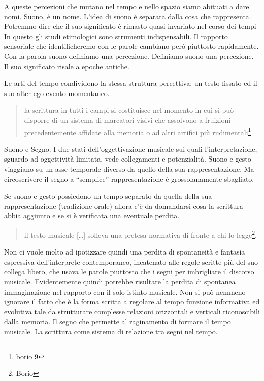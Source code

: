 
A queste percezioni che mutano nel tempo e nello spazio siamo abituati a dare
nomi. Suono, è un nome. L'idea di suono è separata dalla cosa che rappresenta.
Potremmo dire che il suo significato è rimasto quasi invariato nel corso dei tempi
In questo gli studi etimologici sono strumenti indispensabili.
Il rapporto sensoriale che identificheremo con le parole cambiano però piuttosto
rapidamente. Con la parola suono definiamo una percezione. Definiamo suono una
percezione. Il suo significato risale a epoche antiche.

Le arti del tempo condividono la stessa struttura percettiva: un testo fissato
ed il suo alter ego evento momentaneo.

\begin{quote}
	la scrittura in tutti i campi si costituisce nel momento in cui si può disporre
	di un sistema di marcatori visivi che assolvono a fruizioni precedentemente
	affidate alla memoria o ad altri artifici più rudimentali\footnote{borio 9}
\end{quote}

Suono e Segno. I due stati dell'oggettivazione musicale sui quali l'interpretazione,
sguardo ad oggettività limitata, vede collegamenti e potenzialità. Suono e gesto
viaggiano su un asse temporale diverso da quello della sua rappresentazione. Ma
circoscrivere il segno a “semplice” rappresentazione è grossolanamente sbagliato.

Se suono e gesto possiedono un tempo separato da quella della sua rappresentazione
(tradizione orale) allora c'è da domandarsi cosa la scrittura abbia aggiunto e se
si è verificata una eventuale perdita.

\begin{quote}
	il testo musicale [\ldots] solleva una pretesa normativa di fronte a chi lo
	legge\footnote{Borio}.
\end{quote}

Non ci vuole molto ad ipotizzare quindi una perdita di spontaneità e fantasia
espressiva dell'interprete contemporaneo, incatenato alle regole scritte più del
suo collega libero, che usava le parole piuttosto che i segni per imbrigliare il
discorso musicale. Evidentemente quindi potrebbe risultare la perdita di spontanea
immaginazione nel rapporto con il solo istinto musicale. Non si può nemmeno
ignorare il fatto che è la forma scritta a regolare al tempo funzione informativa
ed evolutiva tale da strutturare complesse relazioni orizzontali e verticali
riconoscibili dalla memoria. Il segno che permette al raginamento di formare il
tempo musicale. La scrittura come sistema di relazione tra segni nel tempo.

